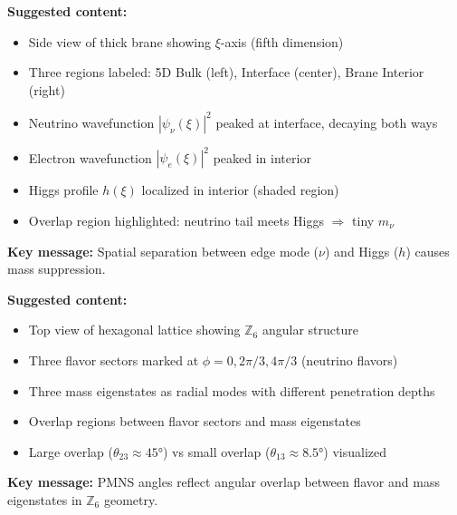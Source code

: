 
\begin{tcolorbox}[colback=gray!10, colframe=gray!50, title=\textbf{Figure Placeholder 1: Edge-Mode Localization Schematic}]
\textbf{Suggested content:}
\begin{itemize}[nosep]
    \item Side view of thick brane showing $\xi$-axis (fifth dimension)
    \item Three regions labeled: 5D Bulk (left), Interface (center), Brane Interior (right)
    \item Neutrino wavefunction $|\psi_\nu(\xi)|^2$ peaked at interface, decaying both ways
    \item Electron wavefunction $|\psi_e(\xi)|^2$ peaked in interior
    \item Higgs profile $h(\xi)$ localized in interior (shaded region)
    \item Overlap region highlighted: neutrino tail meets Higgs $\Rightarrow$ tiny $m_\nu$
\end{itemize}
\textbf{Key message:} Spatial separation between edge mode ($\nu$) and Higgs ($h$) causes mass suppression.
\end{tcolorbox}

\begin{tcolorbox}[colback=gray!10, colframe=gray!50, title=\textbf{Figure Placeholder 2: PMNS Mixing / Angular Overlap Intuition}]
\textbf{Suggested content:}
\begin{itemize}[nosep]
    \item Top view of hexagonal lattice showing $\mathbb{Z}_6$ angular structure
    \item Three flavor sectors marked at $\phi = 0, 2\pi/3, 4\pi/3$ (neutrino flavors)
    \item Three mass eigenstates as radial modes with different penetration depths
    \item Overlap regions between flavor sectors and mass eigenstates
    \item Large overlap ($\theta_{23} \approx 45°$) vs small overlap ($\theta_{13} \approx 8.5°$) visualized
\end{itemize}
\textbf{Key message:} PMNS angles reflect angular overlap between flavor and mass eigenstates in $\mathbb{Z}_6$ geometry.
\end{tcolorbox}

